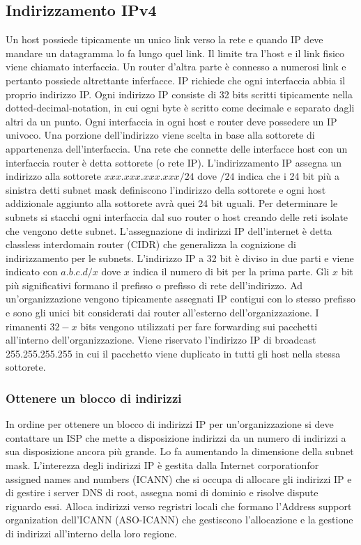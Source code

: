 \subsection{Indirizzamento IPv4}
Un host possiede tipicamente un unico link verso la rete e quando IP deve mandare un datagramma lo fa lungo quel link. Il limite tra l'host e il link fisico
viene chiamato interfaccia. Un router d'altra parte \`e connesso a numerosi link e pertanto possiede altrettante inferfacce. IP richiede che ogni 
interfaccia abbia il proprio indirizzo IP. Ogni indirizzo IP consiste di 32 bits scritti tipicamente nella dotted-decimal-notation, in cui ogni byte \`e 
scritto come decimale e separato dagli altri da un punto. Ogni interfaccia in ogni host e router deve possedere un IP univoco. Una porzione dell'indirizzo
viene scelta in base alla sottorete di appartenenza dell'interfaccia. Una rete che connette delle interfacce host con un interfaccia router \`e detta
sottorete (o rete IP). L'indirizzamento IP assegna un indirizzo alla sottorete $xxx.xxx.xxx.xxx/24$ dove $/24$ indica che i 24 bit pi\`u a sinistra detti
subnet mask definiscono l'indirizzo della sottorete e ogni host addizionale aggiunto alla sottorete avr\`a quei 24 bit uguali. Per determinare le subnets
si stacchi ogni interfaccia dal suo router o host creando delle reti isolate che vengono dette subnet. L'assegnazione di indirizzi IP dell'internet \`e
detta classless interdomain router (CIDR) che generalizza la cognizione di indirizzamento per le subnets. L'indirizzo IP a 32 bit \`e diviso in due 
parti e viene indicato con $a.b.c.d/x$ dove $x$ indica il numero di bit per la prima parte. Gli $x$ bit pi\`u significativi formano il prefisso o prefisso
di rete dell'indirizzo. Ad un'organizzazione vengono tipicamente assegnati IP contigui con lo stesso prefisso e sono gli unici bit considerati dai router
all'esterno dell'organizzazione. I rimanenti $32-x$ bits vengono utilizzati per fare forwarding sui pacchetti all'interno dell'organizzazione. Viene 
riservato l'indirizzo IP di broadcast 255.255.255.255 in cui il pacchetto viene duplicato in tutti gli host nella stessa sottorete. 
\subsubsection{Ottenere un blocco di indirizzi}
In ordine per ottenere un blocco di indirizzi IP per un'organizzazione si deve contattare un ISP che mette a disposizione indirizzi da un numero di 
indirizzi a sua disposizione ancora pi\`u grande. Lo fa aumentando la dimensione della subnet mask. L'interezza degli indirizzi IP \`e gestita dalla 
Internet corporationfor assigned names and numbers (ICANN) che si occupa di allocare gli indirizzi IP e di gestire i server DNS di root, assegna nomi di 
dominio e risolve dispute riguardo essi. Alloca indirizzi verso regristri locali che formano l'Address support organization dell'ICANN (ASO-ICANN) che 
gestiscono l'allocazione e la gestione di indirizzi all'interno della loro regione. 
